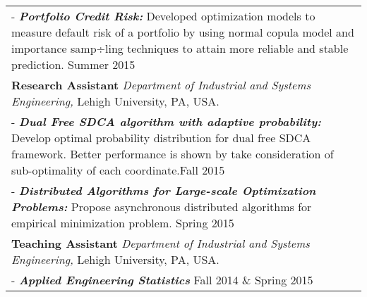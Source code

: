 \documentclass[a4paper,11pt]{article} %
\begin{document}
\begin{tabular}{p{17.5cm}}
\footnotesize{- \textbf{\emph{Portfolio Credit Risk: }} }
Developed optimization models to measure default risk of a portfolio by using normal copula model and importance samp÷ling techniques to attain more reliable and stable prediction. \hfill{Summer 2015}\\
\textbf{Research Assistant} \emph{Department of Industrial and Systems Engineering,} Lehigh University, PA, USA. \\
\footnotesize{- \textbf{\emph{Dual Free SDCA algorithm with adaptive probability:}} Develop optimal probability distribution for dual free SDCA framework. Better performance is shown by take consideration of sub-optimality of each coordinate.\hfill{Fall 2015}}\\
\footnotesize{- \textbf{\emph{Distributed Algorithms for Large-scale Optimization Problems:}} Propose asynchronous distributed algorithms for empirical minimization problem. \hfill{Spring 2015}}\\
\textbf{Teaching Assistant} \emph{Department of Industrial and Systems Engineering,} Lehigh University, PA, USA. \\
\footnotesize{- \textbf{\emph{Applied Engineering Statistics}} \hfill{Fall 2014 \& Spring 2015}}\\
\end{tabular}
\end{document}
